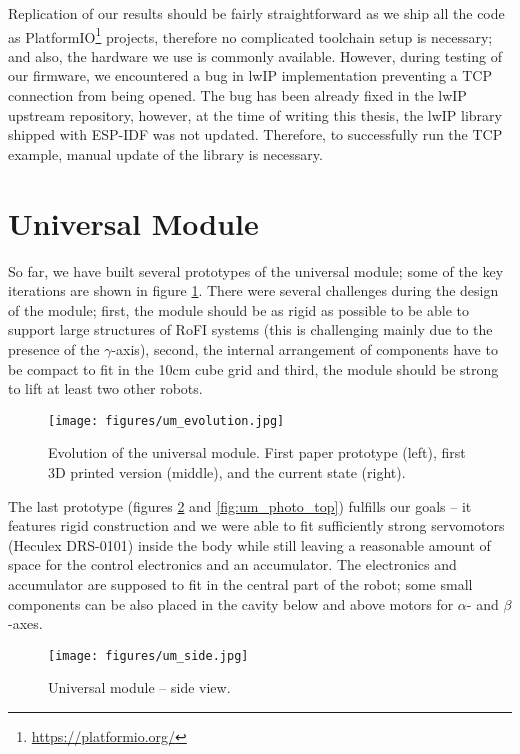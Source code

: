 Replication of our results should be fairly straightforward as we ship all the
code as PlatformIO\footnote{\url{https://platformio.org/}} projects, therefore
no complicated toolchain setup is necessary; and also, the hardware we use is
commonly available. However, during testing of our firmware, we encountered a
bug in lwIP implementation preventing a TCP connection from being opened. The
bug has been already fixed in the lwIP upstream repository, however, at the time
of writing this thesis, the lwIP library shipped with ESP-IDF was not updated.
Therefore, to successfully run the TCP example, manual update of the library is
necessary.

\section{Universal Module}

So far, we have built several prototypes of the universal module; some of the
key iterations are shown in figure \ref{fig:um_evolution}. There were several
challenges during the design of the module; first, the module should be as rigid
as possible to be able to support large structures of RoFI systems (this is
challenging mainly due to the presence of the $\gamma$-axis), second, the
internal arrangement of components have to be compact to fit in the 10cm cube
grid and third, the module should be strong to lift at least two other robots.

\begin{figure}[!t]
    \centering
    \texttt{[image: figures/um\_evolution.jpg]}
    \caption{Evolution of the universal module. First paper prototype (left),
    first 3D printed version (middle), and the current state (right).}
    \label{fig:um_evolution}
\end{figure}

The last prototype (figures \ref{fig:um_photo_side} and \ref{fig:um_photo_top})
fulfills our goals -- it features rigid construction and we were able to fit
sufficiently strong servomotors (Heculex DRS-0101) inside the body while still
leaving a reasonable amount of space for the control electronics and an
accumulator. The electronics and accumulator are supposed to fit in the central
part of the robot; some small components can be also placed in the cavity below
and above motors for $\alpha$- and $\beta$-axes.

\begin{figure}[!t]
    \centering
    \texttt{[image: figures/um\_side.jpg]}
    \caption{Universal module -- side view.}
    \label{fig:um_photo_side}
\end{figure}

